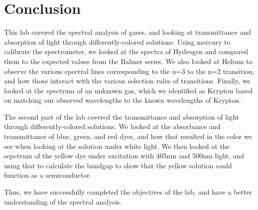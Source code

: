 \section{Conclusion}
This lab covered the spectral analysis of gases, and looking at transmittance and absorption of light through differently-colored solutions. Using mercury to calibrate the spectrometer, we looked at the spectra of Hydrogen and compared them to the expected values from the Balmer series. We also looked at Helium to observe the various spectral lines corresponding to the n=3 to the n=2 transition, and how those interact with the various selection rules of transitions. Finally, we looked at the spectrum of an unknown gas, which we identified as Krypton based on matching our observed wavelengths to the known wavelengths of Krypton.

The second part of the lab covered the transmittance and absorption of light through differently-colored solutions. We looked at the absorbance and transmittance of blue, green, and red dyes, and how that resulted in the color we see when looking at the solution under white light. We then looked at the sepctrum of the yellow dye under excitation with 405nm and 500nm light, and using that to calculate the bandgap to show that the yellow solution could function as a semiconductor.

Thus, we have successfully completed the objectives of the lab, and have a better understanding of the spectral analysis.
